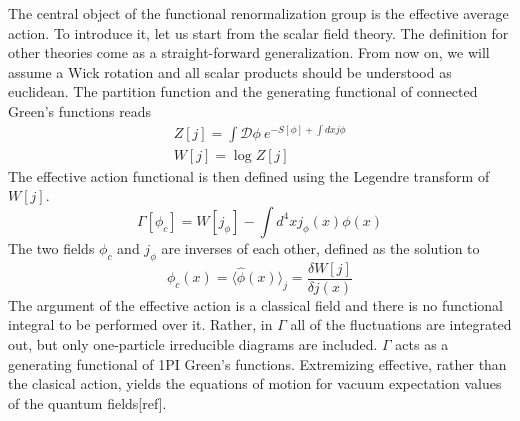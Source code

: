 \documentclass[11pt, a4paper]{article}
\begin{document}


The central object of the functional renormalization group is the effective average action.
To introduce it, let us start from the scalar field theory. The definition for other theories come as a straight-forward generalization.
From now on, we will assume a Wick rotation
and all scalar products should be understood as euclidean.
The partition function and the generating functional of connected Green's functions reads
\begin{gather}
    Z[j] = \int \mathcal{D}\phi \ e^{-S[\phi] + \int dx j \phi} \\
    W[j] = \log{Z[j]}
\end{gather}
The effective action functional is then defined using the Legendre transform of $W[j]$.
\begin{equation}
    \Gamma[\phi_c] = W[j_\phi] - \int d^4 x j_\phi(x) \phi(x)
\end{equation}
The two fields $\phi_c$ and $j_\phi$ are inverses of each other, defined as the solution to
\begin{equation}
    \phi_c(x) = \langle \hat\phi (x) \rangle_j = \frac{\delta W[j]}{\delta j(x)}
\end{equation}
The argument of the effective action is a classical field and there is no functional integral to be performed over it.
Rather, in $\Gamma$ all of the fluctuations are integrated out, but only one-particle irreducible diagrams
are included. $\Gamma$ acts as a generating functional of 1PI Green's functions. Extremizing effective, rather than
the clasical action, yields the equations of motion for vacuum expectation values of the quantum fields[ref].
\end{document}

